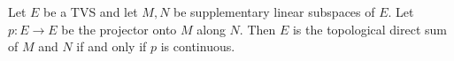 Let $E$ be a TVS and let $M, N$ be supplementary linear subspaces of $E$. Let $p \colon E \to E$ be the projector onto $M$ along $N$. Then $E$ is the topological direct sum of $M$ and $N$ if and only if $p$ is continuous.
